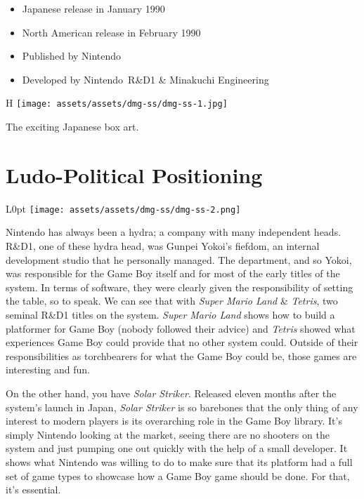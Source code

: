 \documentclass{book}
\begin{document}
\begin{itemize} \setlength\itemsep{-0.4em}
\item Japanese release in January 1990
\item North American release in February 1990
\item Published by Nintendo
\item Developed by Nintendo R\&D1 \& Minakuchi Engineering
\end{itemize}\noindent

\begin{wrapfigure}{H}{\linewidth}
\vskip 4pt
\centering \texttt{[image: assets/assets/dmg-ss/dmg-ss-1.jpg]}\par\pagetwodescription The exciting Japanese box art.\end{wrapfigure}
\clearpage

\FloatBarrier\needspace{5pt}\section*{Ludo-Political Positioning}\nopagebreak[4]

\begin{wrapfigure}{L}{0pt} \texttt{[image: assets/assets/dmg-ss/dmg-ss-2.png]}\end{wrapfigure}
Nintendo has always been a hydra; a company with many independent heads. R\&D1, one of these hydra head, was Gunpei Yokoi’s fiefdom, an internal development studio that he personally managed. The department, and so Yokoi, was responsible for the Game Boy itself and for most of the early titles of the system. In terms of software, they were clearly given the responsibility of setting the table, so to speak. We can see that with \emph{Super Mario Land} \& \emph{Tetris}, two seminal R\&D1 titles on the system. \emph{Super Mario Land} shows how to build a platformer for Game Boy (nobody followed their advice) and \emph{Tetris} showed what experiences Game Boy could provide that no other system could. Outside of their responsibilities as torchbearers for what the Game Boy could be, those games are interesting and fun.

On the other hand, you have \emph{Solar Striker}. Released eleven months after the system’s launch in Japan, \emph{Solar Striker} is so barebones that the only thing of any interest to modern players is its overarching role in the Game Boy library. It’s simply Nintendo looking at the market, seeing there are no shooters on the system and just pumping one out quickly with the help of a small developer. It shows what Nintendo was willing to do to make sure that its platform had a full set of game types to showcase how a Game Boy game should be done. For that, it’s essential.
\end{document}

